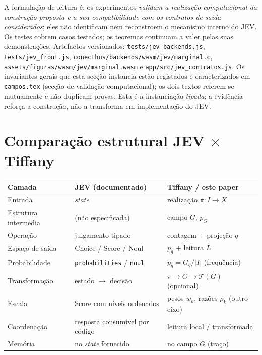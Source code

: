 \documentclass[11pt,a4paper]{article}
\newcommand{\code}[1]{\texttt{\small #1}}
\begin{document}
A formulação de leitura é: os experimentos \emph{validam a realização
computacional da construção proposta e a sua compatibilidade com os contratos
de saída considerados}; eles não identificam nem reconstroem o mecanismo
interno do JEV. Os testes cobrem casos testados; os teoremas continuam a valer
pelas suas demonstrações. Artefactos versionados:
\code{tests/jev\_backends.js}, \code{tests/jev\_front.js},
\code{conecthus/backends/wasm/jev/marginal.c},
\code{assets/figuras/wasm/jev/marginal.wasm} e
\code{app/src/jev\_contratos.js}. Os invariantes gerais que esta secção instancia
estão registados e caracterizados em \texttt{campos.tex} (secção de validação
computacional); os dois textos referem-se mutuamente e não duplicam provas.
Esta é a instanciação \emph{tipada}; a evidência reforça a construção, não a
transforma em implementação do JEV.

\section{Comparação estrutural JEV \(\times\) Tiffany}

\begin{center}
\small
\begin{tabular}{@{}p{}p{}p{}@{}}
\toprule
Camada & JEV (documentado) & Tiffany / este paper \\
\midrule
Entrada & \textit{state} & realização \(\pi\colon I\to X\) \\
Estrutura intermédia & (não especificada) & campo \(G\), \(p_G\) \\
Operação & julgamento tipado & contagem + projeção \(q\) \\
Espaço de saída & Choice / Score / Noul & \(p_q\) + leitura \(L\) \\
Probabilidade & \texttt{probabilities} / \texttt{noul} & \(p_q=G_q/\lvert I\rvert\) (frequência) \\
Transformação & estado \(\to\) decisão & \(\pi\to G\to\mathcal T(G)\) (opcional) \\
Escala & Score com níveis ordenados & pesos \(w_k\), razões \(\rho_k\) (outro eixo) \\
Coordenação & resposta consumível por código & leitura local / transformada \\
Memória & no \textit{state} fornecido & no campo \(G\) (traço) \\
\bottomrule
\end{tabular}
\end{center}
\end{document}
